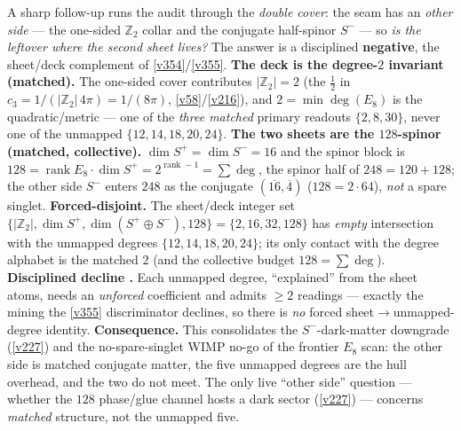 \documentclass[11pt,a4paper]{article}
\newcommand{\cthree}{c_3}
\providecommand{\Z}{\mathbb{Z}}
\begin{document}
\begin{winbox}
A sharp follow-up runs the audit through the \emph{double cover}: the seam has an \emph{other side} --- the one-sided $\Z_2$ collar and the conjugate half-spinor $S^-$ --- so \emph{is the leftover where the second sheet lives?} The answer is a disciplined \textbf{negative}, the sheet/deck complement of \vref{v354}/\vref{v355}. \textbf{The deck is the degree-$2$ invariant (matched).} The one-sided cover contributes $|\Z_2|=2$ (the $\tfrac12$ in $\cthree=1/(|\Z_2|\,4\pi)=1/(8\pi)$, \vref{v58}/\vref{v216}), and $2=\min\deg(E_8)$ is the quadratic/metric --- one of the \emph{three matched} primary readouts $\{2,8,30\}$, never one of the unmapped $\{12,14,18,20,24\}$. \textbf{The two sheets are the $128$-spinor (matched, collective).} $\dim S^+=\dim S^-=16$ and the spinor block is $128=\operatorname{rank}E_8\cdot\dim S^+=2^{\operatorname{rank}-1}=\sum\deg$, the spinor half of $248=120+128$; the other side $S^-$ enters $248$ as the conjugate $(\overline{16},\overline4)$ ($128=2\cdot64$), \emph{not} a spare singlet. \textbf{Forced-disjoint.} The sheet/deck integer set $\{|\Z_2|,\dim S^+,\dim(S^+\!\oplus\!S^-),128\}=\{2,16,32,128\}$ has \emph{empty} intersection with the unmapped degrees $\{12,14,18,20,24\}$; its only contact with the degree alphabet is the matched $2$ (and the collective budget $128=\sum\deg$). \textbf{Disciplined decline \mO.} Each unmapped degree, ``explained'' from the sheet atoms, needs an \emph{unforced} coefficient and admits $\ge2$ readings --- exactly the mining the \vref{v355} discriminator declines, so there is \emph{no} forced sheet$\to$unmapped-degree identity. \textbf{Consequence.} This consolidates the $S^-$-dark-matter downgrade (\vref{v227}) and the no-spare-singlet WIMP no-go of the frontier $E_8$ scan: the other side is matched conjugate matter, the five unmapped degrees are the hull overhead, and the two do not meet. The only live ``other side'' question --- whether the $128$ phase/glue channel hosts a dark sector (\vref{v227}) --- concerns \emph{matched} structure, not the unmapped five.
\end{winbox}
\end{document}

